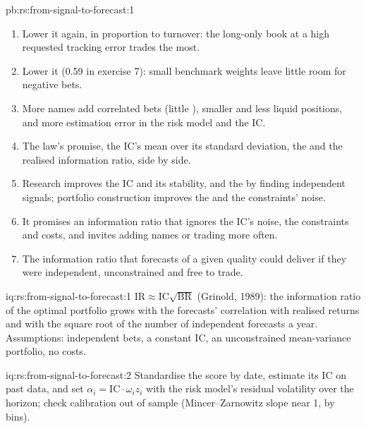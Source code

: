 \begin{solution}{pb:rs:from-signal-to-forecast:1}
\begin{enumerate}
\item Lower it again, in proportion to turnover: the long-only book at a high requested tracking error trades the most.
\item Lower it (0.59 in exercise 7): small benchmark weights leave little room for negative bets.
\item More names add correlated bets (little ), smaller and less liquid positions, and more estimation error in the risk model and the
IC.
\item The law's promise, the IC's mean over its standard deviation, the  and the realised information ratio, side by side.
\item Research improves the IC and its stability, and the  by finding independent signals; portfolio construction improves the  and the constraints' noise.
\item It promises an information ratio that ignores the IC's noise, the constraints and costs, and invites adding names or trading more often.
\item The information ratio that forecasts of a given quality could deliver if they were independent, unconstrained and free to trade.
\end{enumerate}
\end{solution}

\begin{solution}{iq:rs:from-signal-to-forecast:1}
$\mathrm{IR} \approx \mathrm{IC}\sqrt{\mathrm{BR}}$ (Grinold, 1989): the information ratio of the optimal portfolio grows with the forecasts' correlation with
realised returns and with the square root of the number of independent forecasts a year. Assumptions: independent bets, a constant IC, an unconstrained
mean-variance portfolio, no costs.
\end{solution}

\begin{solution}{iq:rs:from-signal-to-forecast:2}
Standardise the score by date, estimate its IC on past data, and set $\alpha_i = \mathrm{IC}\cdot\omega_i z_i$ with the risk model's residual volatility
over the horizon; check calibration out of sample (Mincer--Zarnowitz slope near 1,  by bins).
\end{solution}

